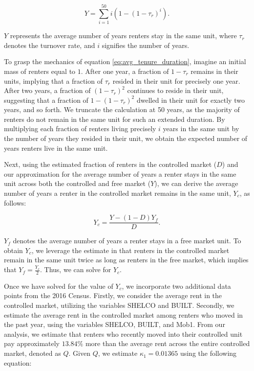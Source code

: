 \documentclass[parskip=full]{article}
\begin{document}
\begin{equation}\label{eq:avg_tenure_duration}
    Y=\sum_{i=1}^{50}i(1-(1-\tau_{r})^{i}).
\end{equation}

\noindent $Y$ represents the average number of years renters stay in the same unit, where $\tau_{r}$ denotes the turnover rate, and $i$ signifies the number of years.

To grasp the mechanics of equation \eqref{eq:avg_tenure_duration}, imagine an initial mass of renters equal to $1$. After one year, a fraction of $1-\tau_{r}$ remains in their units, implying that a fraction of $\tau_{r}$ resided in their unit for precisely one year. After two years, a fraction of $(1-\tau_{r})^2$ continues to reside in their unit, suggesting that a fraction of $1-(1-\tau_{r})^2$ dwelled in their unit for exactly two years, and so forth. We truncate the calculation at 50 years, as the majority of renters do not remain in the same unit for such an extended duration. By multiplying each fraction of renters living precisely $i$ years in the same unit by the number of years they resided in their unit, we obtain the expected number of years renters live in the same unit.

Next, using the estimated fraction of renters in the controlled market ($D$) and our approximation for the average number of years a renter stays in the same unit across both the controlled and free market ($Y$), we can derive the average number of years a renter in the controlled market remains in the same unit, $Y_{c}$, as follows:

\begin{equation*}
    Y_{c}=\frac{Y-(1-D)Y_{f}}{D}.
\end{equation*}

\noindent $Y_{f}$ denotes the average number of years a renter stays in a free market unit. To obtain $Y_{c}$, we leverage the estimate in \citet{cjq-2023} that renters in the controlled market remain in the same unit twice as long as renters in the free market, which implies that $Y_{f}=\frac{Y_{c}}{2}$. Thus, we can solve for $Y_{c}$.

Once we have solved for the value of $Y_{c}$, we incorporate two additional data points from the 2016 Census. Firstly, we consider the average rent in the controlled market, utilizing the variables SHELCO and BUILT. Secondly, we estimate the average rent in the controlled market among renters who moved in the past year, using the variables SHELCO, BUILT, and Mob1. From our analysis, we estimate that renters who recently moved into their controlled unit pay approximately $13.84\%$ more than the average rent across the entire controlled market, denoted as $Q$. Given $Q$, we estimate $\kappa_{1} = 0.01365$ using the following equation:
\end{document}
